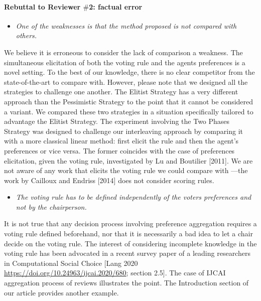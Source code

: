 \documentclass{article}
\begin{document}
\paragraph{Rebuttal to Reviewer $\#$2: factual error}
\begin{itemize}
	\item \textit{One of the weaknesses is that the method proposed is not compared with others.}
\end{itemize}
We believe it is erroneous to consider the lack of comparison a weakness. The simultaneous elicitation of both the voting rule and the agents preferences is a novel setting. To the best of our knowledge, there is no clear competitor from the state-of-the-art to compare with. However, please note that we designed all the strategies to challenge one another. The Elitist Strategy has a very different approach than the Pessimistic Strategy to the point that it cannot be considered a variant. We compared these two strategies in a situation specifically tailored to advantage the Elitist Strategy. The experiment involving the Two Phases Strategy was designed to challenge our interleaving approach by comparing it with a more classical linear method: first elicit the rule and then the agent’s preferences or vice versa. The former coincides with the case of preferences elicitation, given the voting rule, investigated by Lu and Boutilier [2011].
We are not aware of any work that elicits the voting rule we could compare with —the work by Cailloux and Endriss [2014] does not consider scoring rules.
\begin{itemize}
	\item \textit{The voting rule has to be defined independently of the voters preferences and not by the chairperson.}
\end{itemize}
It is not true that any decision process involving preference aggregation requires a voting rule defined beforehand, nor that it is necessarily a bad idea to let a chair decide on the voting rule. The interest of considering incomplete knowledge in the voting rule has been advocated in a recent survey paper of a leading researchers in Computational Social Choice [Lang 2020 \url{https://doi.org/10.24963/ijcai.2020/680}; section 2.5]. The case of IJCAI aggregation process of reviews illustrates the point. The Introduction section of our article provides another example.
\end{document}
